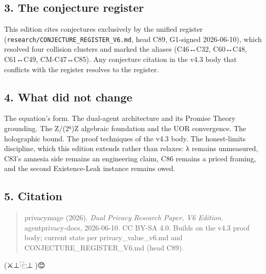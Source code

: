 \documentclass[
]{article}
\begin{document}
\subsection{3. The conjecture register}\label{the-conjecture-register}

This edition cites conjectures exclusively by the unified register
(\texttt{research/CONJECTURE\_REGISTER\_V6.md}, head C89, G1-signed
2026-06-10), which resolved four collision clusters and marked the
aliases (C46↔C32, C60↔C48, C61↔C49, CM-C47↔C85). Any conjecture citation
in the v4.3 body that conflicts with the register resolves to the
register.

\subsection{4. What did not change}\label{what-did-not-change}

The equation's form. The dual-agent architecture and its Promise Theory
grounding. The Z/(2⁶)Z algebraic foundation and the UOR convergence. The
holographic bound. The proof techniques of the v4.3 body. The
honest-limits discipline, which this edition extends rather than
relaxes: λ remains unmeasured, C83's amnesia side remains an engineering
claim, C86 remains a priced framing, and the second Existence-Leak
instance remains owed.

\subsection{5. Citation}\label{citation}

\begin{quote}
privacymage (2026). \emph{Dual Privacy Research Paper, V6 Edition.}
agentprivacy-docs, 2026-06-10. CC BY-SA 4.0. Builds on the v4.3 proof
body; current state per privacy\_value\_v6.md and
CONJECTURE\_REGISTER\_V6.md (head C89).
\end{quote}

(⚔️⊥⿻⊥🧙)😊
\end{document}
